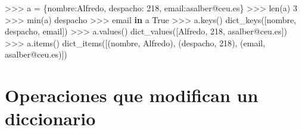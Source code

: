 \documentclass[
  spanish,
  a4paper,
]{scrreport}
\newenvironment{Shaded}{\begin{snugshade}}{\end{snugshade}}
\newcommand{\BuiltInTok}[1]{\textcolor[rgb]{0.00,0.23,0.31}{#1}}
\newcommand{\CommentTok}[1]{\textcolor[rgb]{0.37,0.37,0.37}{#1}}
\newcommand{\DecValTok}[1]{\textcolor[rgb]{0.68,0.00,0.00}{#1}}
\newcommand{\KeywordTok}[1]{\textcolor[rgb]{0.00,0.23,0.31}{\textbf{#1}}}
\newcommand{\NormalTok}[1]{\textcolor[rgb]{0.00,0.23,0.31}{#1}}
\newcommand{\OperatorTok}[1]{\textcolor[rgb]{0.37,0.37,0.37}{#1}}
\newcommand{\StringTok}[1]{\textcolor[rgb]{0.13,0.47,0.30}{#1}}
\newcommand{\VariableTok}[1]{\textcolor[rgb]{0.07,0.07,0.07}{#1}}
\begin{document}
\begin{Shaded}
\begin{Highlighting}[]
\OperatorTok{\textgreater{}\textgreater{}\textgreater{}}\NormalTok{ a }\OperatorTok{=}\NormalTok{ \{}\StringTok{\textquotesingle{}nombre\textquotesingle{}}\NormalTok{:}\StringTok{\textquotesingle{}Alfredo\textquotesingle{}}\NormalTok{, }\StringTok{\textquotesingle{}despacho\textquotesingle{}}\NormalTok{: }\DecValTok{218}\NormalTok{, }\StringTok{\textquotesingle{}email\textquotesingle{}}\NormalTok{:}\StringTok{\textquotesingle{}asalber@ceu.es\textquotesingle{}}\NormalTok{\}}
\OperatorTok{\textgreater{}\textgreater{}\textgreater{}} \BuiltInTok{len}\NormalTok{(a)}
\DecValTok{3}
\OperatorTok{\textgreater{}\textgreater{}\textgreater{}} \BuiltInTok{min}\NormalTok{(a)}
\CommentTok{\textquotesingle{}despacho\textquotesingle{}}
\OperatorTok{\textgreater{}\textgreater{}\textgreater{}} \StringTok{\textquotesingle{}email\textquotesingle{}} \KeywordTok{in}\NormalTok{ a}
\VariableTok{True}
\OperatorTok{\textgreater{}\textgreater{}\textgreater{}}\NormalTok{ a.keys()}
\NormalTok{dict\_keys([}\StringTok{\textquotesingle{}nombre\textquotesingle{}}\NormalTok{, }\StringTok{\textquotesingle{}despacho\textquotesingle{}}\NormalTok{, }\StringTok{\textquotesingle{}email\textquotesingle{}}\NormalTok{])}
\OperatorTok{\textgreater{}\textgreater{}\textgreater{}}\NormalTok{ a.values()}
\NormalTok{dict\_values([}\StringTok{\textquotesingle{}Alfredo\textquotesingle{}}\NormalTok{, }\DecValTok{218}\NormalTok{, }\StringTok{\textquotesingle{}asalber@ceu.es\textquotesingle{}}\NormalTok{])}
\OperatorTok{\textgreater{}\textgreater{}\textgreater{}}\NormalTok{ a.items()}
\NormalTok{dict\_items([(}\StringTok{\textquotesingle{}nombre\textquotesingle{}}\NormalTok{, }\StringTok{\textquotesingle{}Alfredo\textquotesingle{}}\NormalTok{), (}\StringTok{\textquotesingle{}despacho\textquotesingle{}}\NormalTok{, }\DecValTok{218}\NormalTok{), (}\StringTok{\textquotesingle{}email\textquotesingle{}}\NormalTok{, }\StringTok{\textquotesingle{}asalber@ceu.es\textquotesingle{}}\NormalTok{)])}
\end{Highlighting}
\end{Shaded}

\section{Operaciones que modifican un
diccionario}\label{operaciones-que-modifican-un-diccionario}
\end{document}
